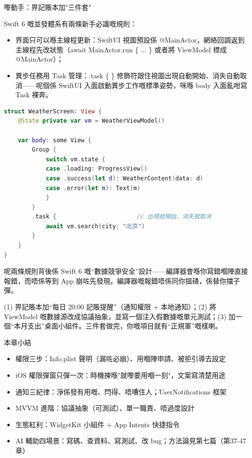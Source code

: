 \begin{tcbpractice}{嚟動手：畀記賬本加"三件套"}

Swift 6 嘅並發體系有兩條新手必識嘅規則：

\begin{itemize}
  \item 界面只可以喺主線程更新：SwiftUI 視圖預設係 @MainActor，網絡回調返到主線程先改狀態（await MainActor.run \{ ... \} 或者將 ViewModel 標成 @MainActor）；
  \item 異步任務用 Task 管理：.task \{ \} 修飾符跟住視圖出現自動開始、消失自動取消——呢個係 SwiftUI 入面啟動異步工作嘅標準姿勢，咪喺 body 入面亂咁寫 Task 裸奔。
\end{itemize}

\begin{lstlisting}[language=Swift]
struct WeatherScreen: View {
    @State private var vm = WeatherViewModel()

    var body: some View {
        Group {
            switch vm.state {
            case .loading: ProgressView()
            case .success(let d): WeatherContent(data: d)
            case .error(let m): Text(m)
            }
        }
        .task {                       // 出現就開始，消失就取消
            await vm.search(city: "北京")
        }
    }
}
\end{lstlisting}

呢兩條規則背後係 Swift 6 嘅“數據競爭安全”設計——編譯器會喺你寫錯嗰陣直接報錯，而唔係等到 App 崩咗先發現。編譯器嘅報錯唔係同你搵碴，係替你擋子彈。

(1) 畀記賬本加“每日 20:00 記賬提醒”（通知權限 + 本地通知）；(2) 將 ViewModel 嘅數據源改成協議抽象，並寫一個注入假數據嘅單元測試；(3) 加一個“本月支出”桌面小組件。三件套做完，你嘅項目就有“正規軍”嘅樣喇。

\end{tcbpractice}

\begin{tcbsummary}{本章小結}
\begin{itemize}
  \item 權限三步：Info.plist 聲明（漏咗必崩）、用嗰陣申請、被拒引導去設定
  \item iOS 權限彈窗只彈一次：時機揀喺"就嚟要用嗰一刻"，文案寫清楚用途
  \item 通知三紀律：淨係發有用嘅、閂得、唔嘈住人；UserNotifications 框架
  \item MVVM 進階：協議抽象（可測試）、單一職責、唔過度設計
  \item 生態紅利：WidgetKit 小組件 + App Intents 快捷指令
  \item AI 輔助四場景：寫碼、查資料、寫測試、改 bug；方法論見第七篇（第37-47章）
\end{itemize}

\end{tcbsummary}
